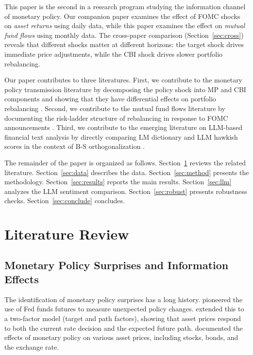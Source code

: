 \documentclass[11pt,a4paper]{article}
\begin{document}
This paper is the second in a research program studying the information channel of monetary policy. Our companion paper \citep{zhang2026beyond} examines the effect of FOMC shocks on \textit{asset returns} using daily data, while this paper examines the effect on \textit{mutual fund flows} using monthly data. The cross-paper comparison (Section~\ref{sec:cross}) reveals that different shocks matter at different horizons: the target shock drives immediate price adjustments, while the CBI shock drives slower portfolio rebalancing.

Our paper contributes to three literatures. First, we contribute to the monetary policy transmission literature by decomposing the policy shock into MP and CBI components and showing that they have differential effects on portfolio rebalancing \citep{jarocinski2020deconstructing, nakamura2018high, bauer2023reassessment}. Second, we contribute to the mutual fund flows literature by documenting the risk-ladder structure of rebalancing in response to FOMC announcements \citep{chevalier1997risk, lou2012dynamics, goldstein2017investor, hau2016asset}. Third, we contribute to the emerging literature on LLM-based financial text analysis by directly comparing LM dictionary and LLM hawkish scores in the context of B-S orthogonalization \citep{loughran2011when, IMF2025llm, BIS2024cblms}.

The remainder of the paper is organized as follows. Section~\ref{sec:lit} reviews the related literature. Section~\ref{sec:data} describes the data. Section~\ref{sec:method} presents the methodology. Section~\ref{sec:results} reports the main results. Section~\ref{sec:llm} analyzes the LLM sentiment comparison. Section~\ref{sec:robust} presents robustness checks. Section~\ref{sec:conclude} concludes.

\section{Literature Review}
\label{sec:lit}

\subsection{Monetary Policy Surprises and Information Effects}

The identification of monetary policy surprises has a long history. \citet{kuttner2001monetary} pioneered the use of Fed funds futures to measure unexpected policy changes. \citet{gurkaynak2005actions} extended this to a two-factor model (target and path factors), showing that asset prices respond to both the current rate decision and the expected future path. \citet{bernanke2005irregularities} documented the effects of monetary policy on various asset prices, including stocks, bonds, and the exchange rate.
\end{document}
